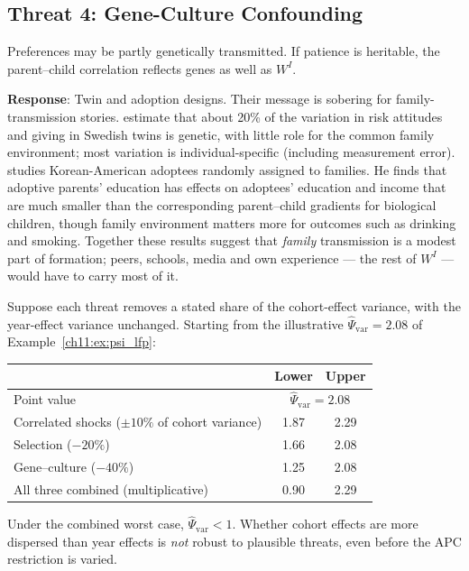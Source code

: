 \documentclass[../structural_economics_book.tex]{subfiles}
\begin{document}
\subsection{Threat 4: Gene-Culture Confounding}

Preferences may be partly genetically transmitted. If patience is heritable, the parent--child correlation reflects genes as well as $W^I$.

\textbf{Response}: Twin and adoption designs. Their message is sobering for family-transmission stories. \citet[\textit{QJE}]{cesarini2009genetic} estimate that about 20\% of the variation in risk attitudes and giving in Swedish twins is genetic, with little role for the common family environment; most variation is individual-specific (including measurement error). \citet[\textit{QJE}]{sacerdote2007how} studies Korean-American adoptees randomly assigned to families. He finds that adoptive parents' education has effects on adoptees' education and income that are much smaller than the corresponding parent--child gradients for biological children, though family environment matters more for outcomes such as drinking and smoking. Together these results suggest that \textit{family} transmission is a modest part of formation; peers, schools, media and own experience --- the rest of $W^I$ --- would have to carry most of it.

\begin{proposition}\label{ch11:prop:bounds}
Suppose each threat removes a stated share of the cohort-effect variance, with the year-effect variance unchanged. Starting from the illustrative $\hat{\Psi}_{\text{var}} = 2.08$ of Example~\ref{ch11:ex:psi_lfp}:
\begin{center}
\begin{tabular}{lcc}
\toprule
& Lower & Upper \\
\midrule
Point value & \multicolumn{2}{c}{$\hat{\Psi}_{\text{var}} = 2.08$} \\
Correlated shocks ($\pm 10\%$ of cohort variance) & 1.87 & 2.29 \\
Selection ($-20\%$) & 1.66 & 2.08 \\
Gene--culture ($-40\%$) & 1.25 & 2.08 \\
All three combined (multiplicative) & 0.90 & 2.29 \\
\bottomrule
\end{tabular}
\end{center}
Under the combined worst case, $\hat{\Psi}_{\text{var}} < 1$. Whether cohort effects are more dispersed than year effects is \textit{not} robust to plausible threats, even before the APC restriction is varied.
\end{proposition}
\end{document}
